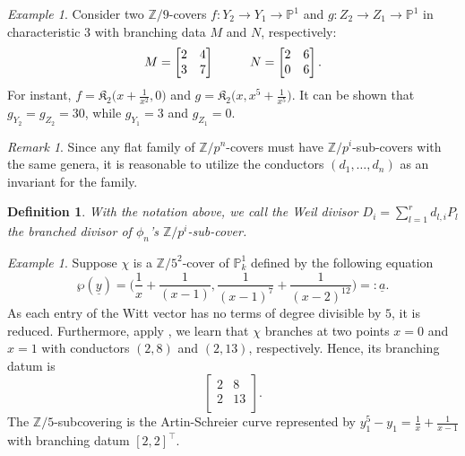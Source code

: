 \documentclass{compositio}
\newcommand{\mat}[1]{\todo[color=green]{MH: #1}}
\newtheorem{definition}[theorem]{Definition}
\theoremstyle{remark}
\newtheorem{example}[theorem]{Example}
\theoremstyle{remark}
\newtheorem{remark}[theorem]{Remark}
\DeclareMathOperator{\ASW}{\mathcal{ASW}}
\begin{document}
\begin{example}
    \label{examplesameendsdifferent}
Consider two $\mathbb{Z}/9$-covers $f: Y_2 \rightarrow Y_1 \rightarrow \mathbb{P}^1$ and $g: Z_2 \rightarrow Z_1 \rightarrow \mathbb{P}^1$ in characteristic 3 with branching data $M$ and $N$, respectively:
\begin{equation*}
M=\begin{bmatrix}
2 & 4 \\
3 & 7 \\
\end{bmatrix} \hspace{10mm} N=\begin{bmatrix}
2 & 6 \\
0 & 6 \\
\end{bmatrix}.
\end{equation*}
For instant, $f=\mathfrak{K}_{2}\big(x+\frac{1}{x^2}, 0\big)$ and $g=\mathfrak{K}_2\big(x, x^5+\frac{1}{x^5} \big)$. It can be shown that $g_{Y_2}=g_{Z_2}=30$, while $g_{Y_1}=3$ and $g_{Z_1}=0$.
\end{example}

\begin{remark}
    Since any flat family of $\mathbb{Z}/p^n$-covers must have $\mathbb{Z}/p^i$-sub-covers with the same genera, it is reasonable to utilize the conductors $(d_1, \ldots, d_n)$ as an invariant for the family.
\end{remark}



\begin{definition}
With the notation above, we call the Weil divisor $D_i=\sum_{l=1}^r d_{l,i} P_l$ the \textit{branched divisor} of $\phi_n$'s $\mathbb{Z}/p^i$-sub-cover.
\end{definition}

\begin{example}
Suppose $\chi$ is a $\mathbb{Z}/5^2$-cover of $\mathbb{P}^1_k$ defined by the following equation
\[ \wp(\underline{y})= \bigg( \frac{1}{x}+\frac{1}{(x-1)}, \frac{1}{(x-1)^7}+\frac{1}{(x-2)^{12}} \bigg)=:\underline{a}. \]
As each entry of the Witt vector has no terms of degree divisible by $5$, it is reduced. Furthermore, apply \cite[Theorem 1]{MR1935414}, we learn that $\chi$ branches at two points $x=0$ and $x=1$ with conductors $(2, 8)$ and $(2, 13)$, respectively. Hence, its branching datum is
\[ \begin{bmatrix}
2 & 8 \\
2 & 13 \\
\end{bmatrix}. \]
The $\mathbb{Z}/5$-subcovering is the Artin-Schreier curve represented by $y_1^5-y_1=\frac{1}{x}+\frac{1}{x-1}$ with branching datum $[2,2]^{\top}$.
\end{example}
\end{document}
